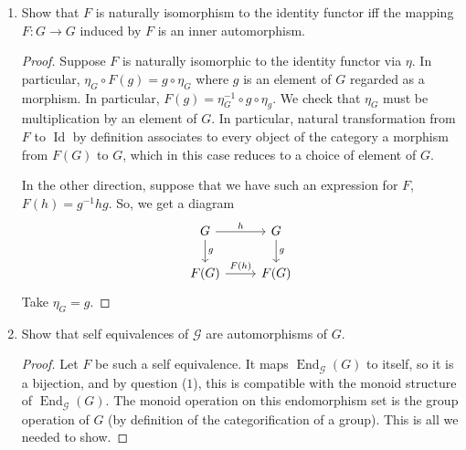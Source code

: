 \documentclass[reqno]{amsart}
\DeclareMathOperator{\Id}{Id}
\DeclareMathOperator{\End}{End}
\theoremstyle{definition}
\theoremstyle{remark}
\begin{document}
\begin{enumerate}
  \item Show that $F$ is naturally isomorphism to the identity functor iff the
    mapping $F : G \to G$ induced by $F$ is an inner automorphism.

    \begin{proof}
      Suppose $F$ is naturally isomorphic to the identity functor via $\eta$. In
      particular, $\eta_G \circ F(g) = g \circ \eta_G$ where $g$ is an element
      of $G$ regarded as a morphism. In particular, $F(g) = \eta_G^{-1} \circ g \circ
      \eta_g$. We check that $\eta_G$ must be multiplication by an element of
      $G$. In particular, natural transformation from $F$ to $\Id$ by definition
      associates to every object of the category a morphism from $F(G)$ to $G$,
      which in this case reduces to a choice of element of $G$.

      In the other direction, suppose that we have such an expression
      for $F$, $F(h) = g^{-1}hg$. So, we get a diagram
      \[
        \begin{tikzcd}
          G \ar[r, "h"] \ar[d, "g"] & G \ar[d, "g"] \\
          F(G) \ar[r, "F(h)"] & F(G)
        \end{tikzcd}
      \]
      Take $\eta_G = g$.
    \end{proof}

  \item Show that self equivalences of $\mathcal{G}$ are automorphisms of $G$.

    \begin{proof}
      Let $F$ be such a self equivalence. It maps $\End_\mathcal{G}(G)$ to
      itself, so it is a bijection, and by question ($1$), this is compatible
      with the monoid structure of $\End_\mathcal{G}(G)$. The monoid operation
      on this endomorphism set is the group operation of $G$ (by definition of
      the categorification of a group). This is all we needed to show.
    \end{proof}
\end{enumerate}
\end{document}
